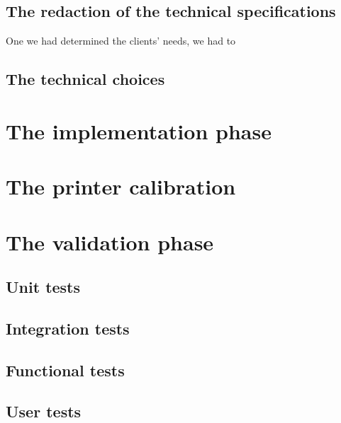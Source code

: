 \documentclass{report}
\begin{document}
\section{The redaction of the technical specifications}

One we had determined the clients' needs, we had to

\section{The technical choices}

\chapter{The implementation phase}

\chapter{The printer calibration}

\chapter{The validation phase}

\section{Unit tests}

\section{Integration tests}

\section{Functional tests}

\section{User tests}


\appendix
\end{document}
